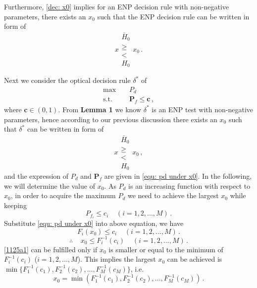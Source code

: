   Furthermore, \eqref{dec: x0}  implies for an ENP decision rule with non-negative parameters, there exists an $x_0$ such that the ENP decision rule can be written in form of 
  \begin{equation}
	\label{1125 dec: x0}
	x\substack{\bar{H}_0 \\\geq\\< \\H_0}x_0\,.
  \end{equation}

  Next we consider the optical decision rule $\delta^\ast$ of
  \begin{equation}
	\begin{split}
	  \max\;\;\;\; &P_d\\
	  \text{s.t.}\;\;\;\;&\mathbf{P}_f \leq \mathbf{c}\,,
	\end{split}
  \end{equation}
  where $\mathbf{c} \in (0, 1)$.
  From \textbf{Lemma 1} we know $\delta^\ast$ is an ENP test with non-negative parameters, hence according to our previous discussion there exists an $x_0$ such that $\delta^\ast$ can be written in form of 
  \begin{equation}
	\label{1124a1}
	x\substack{\bar{H}_0 \\\geq\\< \\H_0}x_0\,,
  \end{equation}
  and the expression of $P_d$ and $\mathbf{P}_f$ are given in \eqref{equ: pd under x0}. 
  In the following, we will determine the value of $x_0$. 
  As $P_d$ is an increasing function with respect to $x_0$, in order to acquire the maximum $P_d$ we need to achieve the largest $x_0$ while keeping 
  \begin{equation}
	P_{f_i} \leq c_i\;\;\;\;(i = 1, 2, ..., M)\,.
  \end{equation}
  Substitute \eqref{equ: pd under x0} into above equation, we have
  \begin{equation}
	F_i(x_0) \leq c_i \;\;\;\;(i=1, 2, ..., M)\,.
  \end{equation}
  \begin{equation}
	\label{1125a1}
	\therefore\;\;\;\; x_0 \leq F^{-1}_{i}(c_i) \;\;\;\;(i=1, 2, ..., M)\,.
  \end{equation}
  \eqref{1125a1} can be fulfilled only if $x_0$ is 
  smaller or equal to the minimum of $F^{-1}_{i}(c_i)$ ($i=1, 2, ..., M$). This implies the largest $x_0$ can be achieved is $\min\{F_1^{-1}(c_1), F_2^{-1}(c_2), ..., F_M^{-1}(c_M)\}$, i.e.
  \begin{equation}
	\label{1127a2}
	x_0 = \min(F_1^{-1}(c_1), F_2^{-1}(c_2), ..., F_M^{-1}(c_M))\,.
  \end{equation}
